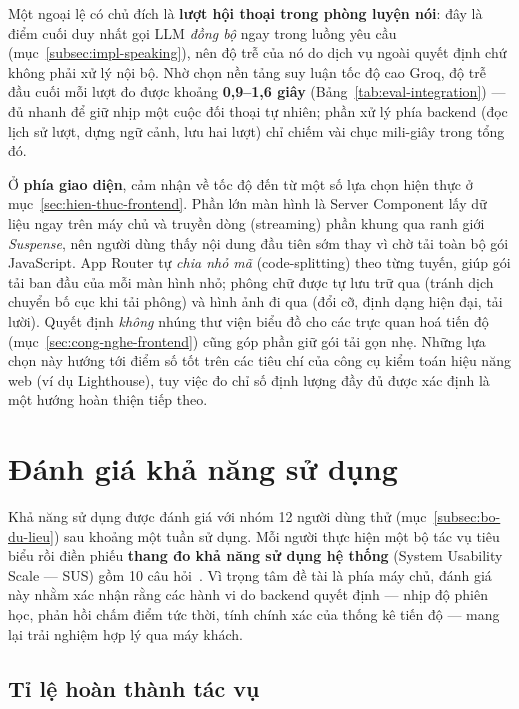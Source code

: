 Một ngoại lệ có chủ đích là \textbf{lượt hội thoại trong phòng luyện nói}: đây
là điểm cuối duy nhất gọi LLM \textit{đồng bộ} ngay trong luồng yêu cầu
(mục~\ref{subsec:impl-speaking}), nên độ trễ của nó do dịch vụ ngoài quyết
định chứ không phải xử lý nội bộ. Nhờ chọn nền tảng suy luận tốc độ cao Groq,
độ trễ đầu cuối mỗi lượt đo được khoảng \textbf{0,9--1,6 giây}
(Bảng~\ref{tab:eval-integration}) --- đủ nhanh để giữ nhịp một cuộc đối thoại
tự nhiên; phần xử lý phía backend (đọc lịch sử lượt, dựng ngữ cảnh, lưu hai
lượt) chỉ chiếm vài chục mili-giây trong tổng đó.

Ở \textbf{phía giao diện}, cảm nhận về tốc độ đến từ một số lựa chọn hiện thực
ở mục~\ref{sec:hien-thuc-frontend}. Phần lớn màn hình là Server Component lấy
dữ liệu ngay trên máy chủ và truyền dòng (streaming) phần khung qua ranh giới
\textit{Suspense}, nên người dùng thấy nội dung đầu tiên sớm thay vì chờ tải
toàn bộ gói JavaScript. App Router tự \textit{chia nhỏ mã} (code-splitting) theo
từng tuyến, giúp gói tải ban đầu của mỗi màn hình nhỏ; phông chữ được tự lưu
trữ qua  (tránh dịch chuyển bố cục khi tải phông) và hình ảnh đi
qua  (đổi cỡ, định dạng hiện đại, tải lười). Quyết định
\textit{không} nhúng thư viện biểu đồ cho các trực quan hoá tiến độ
(mục~\ref{sec:cong-nghe-frontend}) cũng góp phần giữ gói tải gọn nhẹ. Những lựa
chọn này hướng tới điểm số tốt trên các tiêu chí của công cụ kiểm toán hiệu năng
web (ví dụ Lighthouse), tuy việc đo chỉ số định lượng đầy đủ được xác định là
một hướng hoàn thiện tiếp theo.

\section{Đánh giá khả năng sử dụng}
\label{sec:danh-gia-usability}

Khả năng sử dụng được đánh giá với nhóm 12 người dùng thử
(mục~\ref{subsec:bo-du-lieu}) sau khoảng một tuần sử dụng. Mỗi người thực hiện
một bộ tác vụ tiêu biểu rồi điền phiếu \textbf{thang đo khả năng sử dụng hệ
thống} (System Usability Scale --- SUS) gồm 10 câu hỏi~\cite{brooke1996sus}.
Vì trọng tâm đề tài là phía máy chủ, đánh giá này nhằm xác nhận rằng các hành
vi do backend quyết định --- nhịp độ phiên học, phản hồi chấm điểm tức thời,
tính chính xác của thống kê tiến độ --- mang lại trải nghiệm hợp lý qua máy
khách.

\subsection{Tỉ lệ hoàn thành tác vụ}
\label{subsec:usability-tasks}

